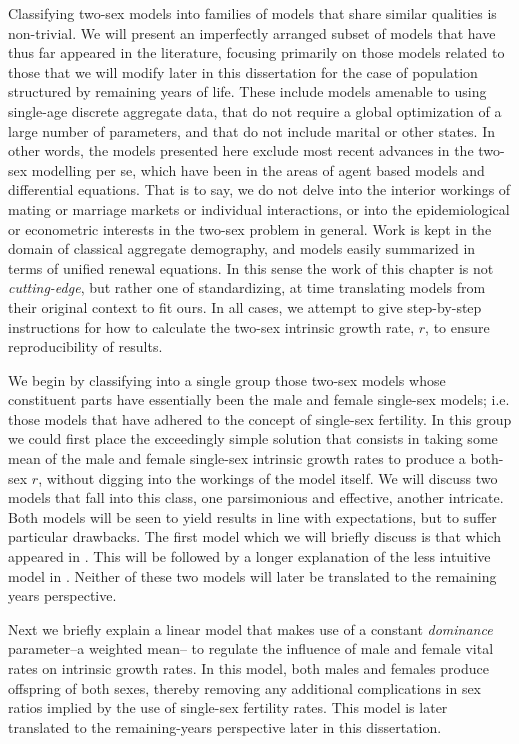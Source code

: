 Classifying two-sex models into families of models that share similar qualities
is non-trivial. We will present an imperfectly arranged subset of models that
have thus far appeared in the literature, focusing primarily on those models
related to those that we will modify later in this dissertation for the case of
population structured by remaining years of life. These include models amenable
to using single-age discrete aggregate data, that do not require a global
optimization of a large number of parameters, and that do not include marital
or other states. In other words, the models presented here exclude most recent
advances in the two-sex modelling per se, which have been in the areas of agent 
based models and differential equations. That is to say, we do not delve into the 
interior workings of mating or marriage markets or individual interactions, or
into the epidemiological or econometric interests in the two-sex problem in general. Work
is kept in the domain of classical aggregate demography, and models easily
summarized in terms of unified renewal equations. In this sense the work of
this chapter is not \textit{cutting-edge}, but rather one of standardizing, at
time translating models from their original context to fit ours. In all cases,
we attempt to give step-by-step instructions for how to calculate the
two-sex intrinsic growth rate, $r$, to ensure reproducibility of results.

We begin by classifying into a single group those two-sex models whose
constituent parts have essentially been the male and female single-sex models;
i.e. those models that have adhered to the concept of single-sex fertility. In this group
we could first place the exceedingly simple solution that consists in taking some 
mean of the male and female single-sex intrinsic growth rates to produce a 
both-sex $r$, without digging into the workings of the model
itself\citep[e.g.][]{kuczynski1932fertility}. We will discuss two models that
fall into this class, one parsimonious and effective, another intricate. Both
models will be seen to yield results in line with expectations, but to suffer
particular drawbacks. The first model which we will briefly discuss is that
which appeared in \citet{pollard1948measurement}. This will be followed by
a longer explanation of the less intuitive model in \citet{mitra1978derivation}.
Neither of these two models will later be translated to the remaining years
perspective.

Next we briefly explain a linear model that makes use of a constant
\textit{dominance} parameter--a weighted mean-- to regulate the
influence of male and female vital rates on intrinsic growth rates. In this
model, both males and females produce offspring of both sexes, thereby
removing any additional complications in sex ratios implied by the use of
single-sex fertility rates. This model is later translated to the
remaining-years perspective later in this dissertation.


